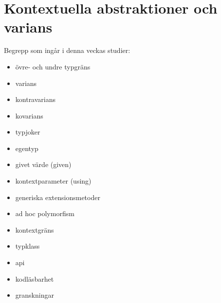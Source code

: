\chapter{Kontextuella abstraktioner och varians}\label{chapter:W11}
Begrepp som ingår i denna veckas studier:
\begin{itemize}[noitemsep,label={$\square$},leftmargin=*]
\item övre- och undre typgräns
\item varians
\item kontravarians
\item kovarians
\item typjoker
\item egentyp
\item givet värde (given)
\item kontextparameter (using)
\item generiska extensionsmetoder
\item ad hoc polymorfism
\item kontextgräns
\item typklass
\item api
\item kodläsbarhet
\item granskningar\end{itemize}
